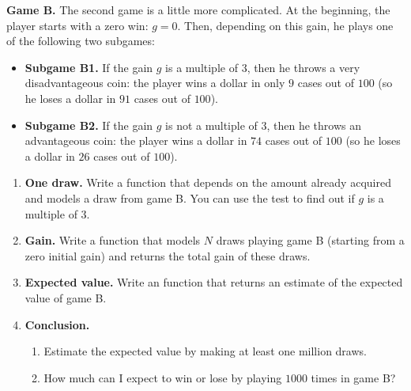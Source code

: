 \documentclass[11pt,class=report,crop=false]{standalone}
\begin{document}
  



\begin{activite}


\textbf{Game B.} The second game is a little more complicated. At the beginning, the player starts with a zero win: $g=0$. Then, depending on this gain, he plays one of the following two subgames:
\begin{itemize}
  \item \textbf{Subgame B1.} If the gain $g$ is a multiple of $3$, then he throws a very disadvantageous coin: the player wins a dollar in only $9$ cases out of $100$ (so he loses a dollar in $91$ cases out of $100$).
  
  \item \textbf{Subgame B2.} If the gain $g$ is not a multiple of $3$, then he throws an advantageous coin: the player wins a dollar in $74$ cases out of $100$ (so he loses a dollar in $26$ cases out of $100$).
\end{itemize}

\begin{enumerate}
  \item \textbf{One draw.}
  Write a  function that depends on the amount already acquired and models a draw from game B. You can use the  test to find out if $g$ is a multiple of $3$.
  
  \item \textbf{Gain.} Write a  function that models $N$ draws playing game B (starting from a zero initial gain) and returns the total gain of these draws.
  
 
  
  \item \textbf{Expected value.} Write an  function that returns an estimate of the expected value of game B.
  
  \item \textbf{Conclusion.}
  \begin{enumerate}
    \item Estimate the expected value by making at least one million draws.
    \item How much can I expect to win or lose by playing $1000$ times in game B?
  \end{enumerate}

\end{enumerate}

\end{activite}
\end{document}
